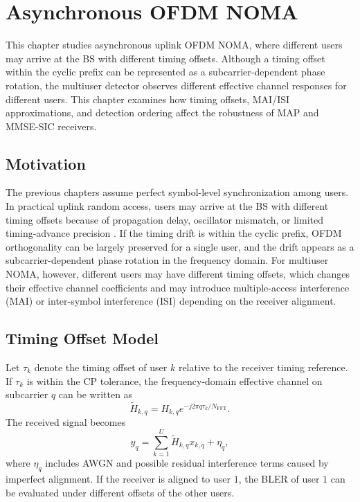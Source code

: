 \chapter{Asynchronous OFDM NOMA}\label{ch:async}

This chapter studies asynchronous uplink OFDM NOMA, where different users may arrive at the BS with different timing offsets. Although a timing offset within the cyclic prefix can be represented as a subcarrier-dependent phase rotation, the multiuser detector observes different effective channel responses for different users. This chapter examines how timing offsets, MAI/ISI approximations, and detection ordering affect the robustness of MAP and MMSE-SIC receivers.

\section{Motivation}

The previous chapters assume perfect symbol-level synchronization among users. In practical uplink random access, users may arrive at the BS with different timing offsets because of propagation delay, oscillator mismatch, or limited timing-advance precision \cite{lin2023aloha,haci2017async}. If the timing drift is within the cyclic prefix, OFDM orthogonality can be largely preserved for a single user, and the drift appears as a subcarrier-dependent phase rotation in the frequency domain. For multiuser NOMA, however, different users may have different timing offsets, which changes their effective channel coefficients and may introduce multiple-access interference (MAI) or inter-symbol interference (ISI) depending on the receiver alignment.


\section{Timing Offset Model}

Let $\tau_k$ denote the timing offset of user $k$ relative to the receiver timing reference. If $\tau_k$ is within the CP tolerance, the frequency-domain effective channel on subcarrier $q$ can be written as
\begin{equation}
    \tilde{H}_{k,q}
    =
    H_{k,q}e^{-j2\pi q\tau_k/N_{\mathrm{FFT}}}.
    \label{eq:async-phase-rotation}
\end{equation}
The received signal becomes
\begin{equation}
    y_q
    =
    \sum_{k=1}^{U}\tilde{H}_{k,q}x_{k,q}
    +
    \eta_q,
    \label{eq:async-received}
\end{equation}
where $\eta_q$ includes AWGN and possible residual interference terms caused by imperfect alignment. If the receiver is aligned to user $1$, the BLER of user $1$ can be evaluated under different offsets of the other users.

